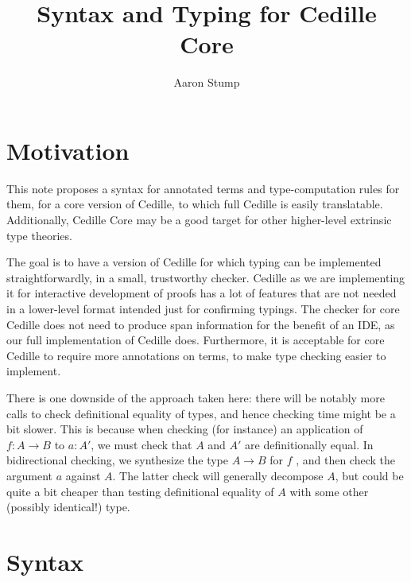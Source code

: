 \documentclass{article}
\begin{document}
\newcommand{\interp}[1]{\llbracket #1 \rrbracket} 
\newtheorem{theorem}{Theorem}
\newtheorem{lemma}[theorem]{Lemma}
\newtheorem{definition}[theorem]{Definition}
\newtheorem{corollary}[theorem]{Corollary}

\title{Syntax and Typing for Cedille Core}

\author{Aaron Stump}

\maketitle

\section{Motivation}

This note proposes a syntax for annotated terms and type-computation
rules for them, for a core version of Cedille, to which full Cedille
is easily translatable.  Additionally, Cedille Core may be a good target
for other higher-level extrinsic type theories.

The goal is to have a version of Cedille for which typing can be
implemented straightforwardly, in a small, trustworthy checker.
Cedille as we are implementing it for interactive development of
proofs has a lot of features that are not needed in a lower-level
format intended just for confirming typings.  The checker for core
Cedille does not need to produce span information for the benefit of
an IDE, as our full implementation of Cedille does.  Furthermore, it
is acceptable for core Cedille to require more annotations on terms,
to make type checking easier to implement.

There is one downside of the approach taken here: there will be
notably more calls to check definitional equality of types, and hence
checking time might be a bit slower.  This is because when checking
(for instance) an application of $f : A \to B$ to $a : A'$, we must
check that $A$ and $A'$ are definitionally equal.  In bidirectional
checking, we synthesize the type $A \to B$ for $f$ , and then check
the argument $a$ against $A$.  The latter check will generally
decompose $A$, but could be quite a bit cheaper than testing
definitional equality of $A$ with some other (possibly identical!)
type.

\section{Syntax}
\label{sec:syntax}
\end{document}
